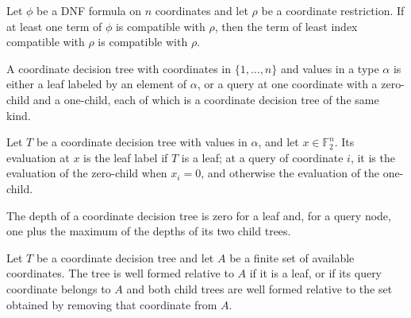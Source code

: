 \begin{theorem}
\label{FABL.DNFFormula.canonicalTerm_compatible}
\leanok
{}
Let $\phi$ be a DNF formula on $n$ coordinates and let $\rho$ be a coordinate
restriction. If at least one term of $\phi$ is compatible with $\rho$, then the term of
least index compatible with $\rho$ is compatible with $\rho$.
\end{theorem}

\begin{definition}
\label{FABL.CoordinateDecisionTree}
\leanok
A coordinate decision tree with coordinates in $\{1,\ldots,n\}$ and values in a type
$\alpha$ is either a leaf labeled by an element of $\alpha$, or a query at one
coordinate with a zero-child and a one-child, each of which is a coordinate decision
tree of the same kind.
\end{definition}

\begin{definition}
\label{FABL.CoordinateDecisionTree.eval}
\leanok
{}
Let $T$ be a coordinate decision tree with values in $\alpha$, and let
$x\in\mathbb{F}_2^n$. Its evaluation at $x$ is the leaf label if $T$ is a leaf; at a
query of coordinate $i$, it is the evaluation of the zero-child when $x_i=0$, and
otherwise the evaluation of the one-child.
\end{definition}

\begin{definition}
\label{FABL.CoordinateDecisionTree.depth}
\leanok
{}
The depth of a coordinate decision tree is zero for a leaf and, for a query node, one
plus the maximum of the depths of its two child trees.
\end{definition}

\begin{definition}
\label{FABL.CoordinateDecisionTree.WellFormed}
\leanok
{}
Let $T$ be a coordinate decision tree and let $A$ be a finite set of available
coordinates. The tree is well formed relative to $A$ if it is a leaf, or if its query
coordinate belongs to $A$ and both child trees are well formed relative to the set
obtained by removing that coordinate from $A$.
\end{definition}

